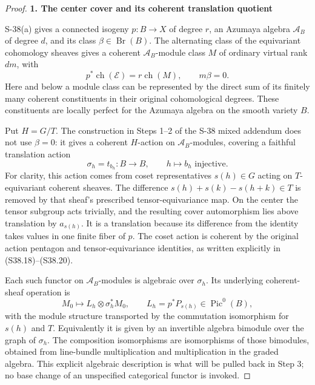\begin{proof}
\par

\medskip\noindent\textbf{1. The center cover and its coherent translation quotient}\quad

S-38(a) gives a connected isogeny \(p:B\to X\) of degree \(r\), an Azumaya algebra \(\mathscr A_B\) of degree \(d\), and its class \(\beta\in\operatorname{Br}(B)\). The alternating class of the equivariant cohomology sheaves gives a coherent \(\mathscr A_B\)-module class \(M\) of ordinary virtual rank \(dm\), with \[
 p^*\operatorname{ch}(\mathcal E)=r\operatorname{ch}(M),
 \qquad m\beta=0.
 \tag{S41.6}
\] Here and below a module class can be represented by the direct sum of its finitely many coherent constituents in their original cohomological degrees. These constituents are locally perfect for the Azumaya algebra on the smooth variety \(B\).

Put \(H=G/T\). The construction in Steps 1--2 of the S-38 mixed addendum does not use \(\beta=0\): it gives a coherent \(H\)-action on \(\mathscr A_B\)-modules, covering a faithful translation action \[
 \sigma_h=t_{b_h}:B\longrightarrow B,
 \qquad h\longmapsto b_h\text{ injective}.
 \tag{S41.7}
\] For clarity, this action comes from coset representatives \(s(h)\in G\) acting on \(T\)-equivariant coherent sheaves. The difference \(s(h)+s(k)-s(h+k)\in T\) is removed by that sheaf's prescribed tensor-equivariance map. On the center the tensor subgroup acts trivially, and the resulting cover automorphism lies above translation by \(a_{s(h)}\). It is a translation because its difference from the identity takes values in one finite fiber of \(p\). The coset action is coherent by the original action pentagon and tensor-equivariance identities, as written explicitly in (S38.18)--(S38.20).

Each such functor on \(\mathscr A_B\)-modules is algebraic over \(\sigma_h\). Its underlying coherent-sheaf operation is \[
 M_0\longmapsto L_h\otimes\sigma_h^*M_0,
 \qquad L_h=p^*P_{s(h)}\in\operatorname{Pic}^0(B),
 \tag{S41.8}
\] with the module structure transported by the commutation isomorphism for \(s(h)\) and \(T\). Equivalently it is given by an invertible algebra bimodule over the graph of \(\sigma_h\). The composition isomorphisms are isomorphisms of those bimodules, obtained from line-bundle multiplication and multiplication in the graded algebra. This explicit algebraic description is what will be pulled back in Step 3; no base change of an unspecified categorical functor is invoked.


\end{proof}

